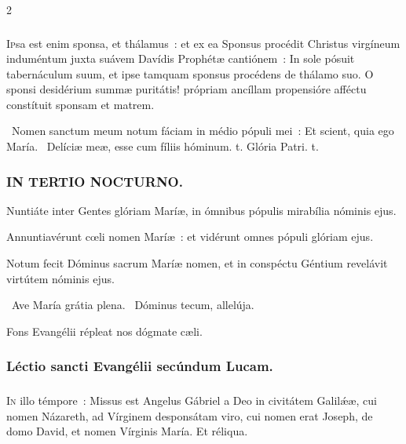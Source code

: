 \documentclass[9pt,twoside]{extarticle}
\begin{document}
\begin{multicols}{2}
{{\subsubsection*{\center {}}
\lettrine{I}psa est enim sponsa, et thálamus~: et ex ea Sponsus procédit Christus virgíneum induméntum juxta suávem Davídis Prophétæ cantiónem~: In sole pósuit tabernáculum suum, et ipse tamquam sponsus procédens de thálamo suo. O sponsi desidérium summæ puritátis! própriam ancíllam propensióre afféctu constítuit sponsam et matrem.

\begin{tightlist}{}
\item {}~Nomen sanctum meum notum fáciam in médio pópuli mei~: \textred{*} Et scient, quia ego María. ~Delíciæ meæ, esse cum fíliis hóminum. t. Glória Patri. t.
\end{tightlist}

\subsubsection*{\center \textsc{IN TERTIO NOCTURNO.}}
\begin{tightlist}{}
\item {} Nuntiáte inter Gentes glóriam Maríæ, in ómnibus pópulis mirabília nóminis ejus.
\item {} Annuntiavérunt cœli nomen Maríæ~: et vidérunt omnes pópuli glóriam ejus.
\item {} Notum fecit Dóminus sacrum Maríæ nomen, et in conspéctu Géntium revelávit virtútem nóminis ejus.
\item {}~Ave María grátia plena. ~Dóminus tecum, allelúja.
\item {\small {} Fons Evangélii répleat nos dógmate cæli.}
\end{tightlist}

\subsubsection*{\center Léctio sancti Evangélii secúndum Lucam.}
\subsubsection*{\center {}}
\lettrine{I}n illo témpore~: Missus est Angelus Gábriel a Deo in civitátem Galilǽæ, cui nomen Názareth, ad Vírginem desponsátam viro, cui nomen erat Joseph, de domo David, et nomen Vírginis María. Et réliqua.

}}
\end{multicols}
\end{document}
